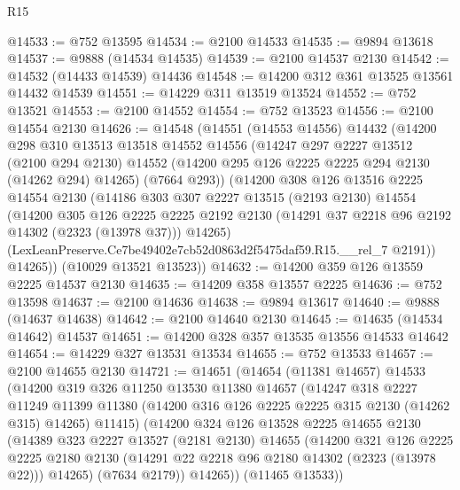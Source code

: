 \begin{lexlean}{R15}
\begin{coremodule}
@14533 := @752 @13595
@14534 := @2100 @14533
@14535 := @9894 @13618
@14537 := @9888 (@14534 @14535)
@14539 := @2100 @14537 @2130
@14542 := @14532 (@14433 @14539) @14436
@14548 := @14200 @312 @361 @13525 @13561 @14432 @14539
@14551 := @14229 @311 @13519 @13524
@14552 := @752 @13521
@14553 := @2100 @14552
@14554 := @752 @13523
@14556 := @2100 @14554 @2130
@14626 := @14548
    (@14551
      (@14553 @14556)
      @14432
      (@14200
        @298
        @310
        @13513
        @13518
        @14552
        @14556
        (@14247
          @297
          @2227
          @13512
          (@2100 @294 @2130)
          @14552
          (@14200 @295 @126 @2225 @2225 @294 @2130 (@14262 @294) @14265)
          (@7664 @293))
        (@14200
          @308
          @126
          @13516
          @2225
          @14554
          @2130
          (@14186
            @303
            @307
            @2227
            @13515
            (@2193 @2130)
            @14554
            (@14200
              @305
              @126
              @2225
              @2225
              @2192
              @2130
              (@14291 @37 @2218 @96 @2192 @14302 (@2323 (@13978 @37)))
              @14265)
            (LexLeanPreserve.Ce7be49402e7cb52d0863d2f5475daf59.R15.__rel_7 @2191))
          @14265))
      (@10029 @13521 @13523))
@14632 := @14200 @359 @126 @13559 @2225 @14537 @2130
@14635 := @14209 @358 @13557 @2225
@14636 := @752 @13598
@14637 := @2100 @14636
@14638 := @9894 @13617
@14640 := @9888 (@14637 @14638)
@14642 := @2100 @14640 @2130
@14645 := @14635 (@14534 @14642) @14537
@14651 := @14200 @328 @357 @13535 @13556 @14533 @14642
@14654 := @14229 @327 @13531 @13534
@14655 := @752 @13533
@14657 := @2100 @14655 @2130
@14721 := @14651
    (@14654
      (@11381 @14657)
      @14533
      (@14200
        @319
        @326
        @11250
        @13530
        @11380
        @14657
        (@14247
          @318
          @2227
          @11249
          @11399
          @11380
          (@14200 @316 @126 @2225 @2225 @315 @2130 (@14262 @315) @14265)
          @11415)
        (@14200
          @324
          @126
          @13528
          @2225
          @14655
          @2130
          (@14389
            @323
            @2227
            @13527
            (@2181 @2130)
            @14655
            (@14200
              @321
              @126
              @2225
              @2225
              @2180
              @2130
              (@14291 @22 @2218 @96 @2180 @14302 (@2323 (@13978 @22)))
              @14265)
            (@7634 @2179))
          @14265))
      (@11465 @13533))

\end{coremodule}
\end{lexlean}
